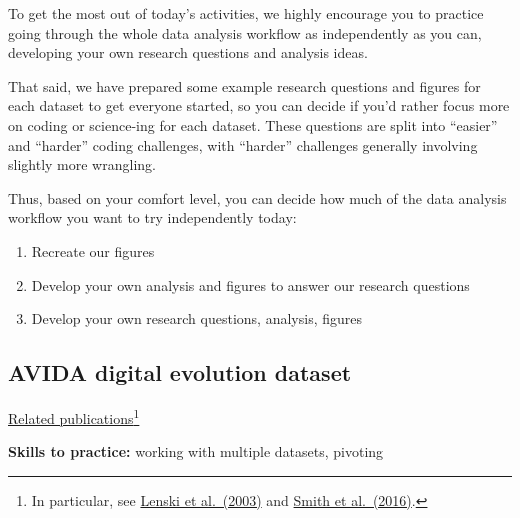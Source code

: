 \documentclass[
  letterpaper,
  DIV=11,
  numbers=noendperiod]{scrreprt}
\providecommand{\tightlist}{%
  \setlength{\itemsep}{0pt}\setlength{\parskip}{0pt}}\usepackage{longtable,booktabs,array}
\begin{document}
\begin{tcolorbox}[enhanced jigsaw, bottomtitle=1mm, bottomrule=.15mm, toprule=.15mm, opacityback=0, leftrule=.75mm, breakable, colback=white, toptitle=1mm, left=2mm, coltitle=black, titlerule=0mm, opacitybacktitle=0.6, title=\textcolor{quarto-callout-tip-color}{\faLightbulb}\hspace{0.5em}{But I thought this was HTLTCode, not HTLTScience!}, rightrule=.15mm, arc=.35mm, colframe=quarto-callout-tip-color-frame, colbacktitle=quarto-callout-tip-color!10!white]

To get the most out of today's activities, we highly encourage you to
practice going through the whole data analysis workflow as independently
as you can, developing your own research questions and analysis ideas.

That said, we have prepared some example research questions and figures
for each dataset to get everyone started, so you can decide if you'd
rather focus more on coding or science-ing for each dataset. These
questions are split into ``easier'' and ``harder'' coding challenges,
with ``harder'' challenges generally involving slightly more wrangling.

Thus, based on your comfort level, you can decide how much of the data
analysis workflow you want to try independently today:

\begin{enumerate}
\def\labelenumi{\arabic{enumi}.}
\tightlist
\item
  Recreate our figures
\item
  Develop your own analysis and figures to answer our research questions
\item
  Develop your own research questions, analysis, figures
\end{enumerate}

\end{tcolorbox}

\subsection{AVIDA digital evolution
dataset}\label{avida-digital-evolution-dataset}

\href{https://avida-ed.msu.edu/digital-evolution/}{Related
publications}\footnote{In particular, see
  \href{https://www.nature.com/articles/nature01568}{Lenski et
  al.~(2003)} and
  \href{https://link.springer.com/article/10.1186/s12052-016-0060-0}{Smith
  et al.~(2016)}.}

\textbf{Skills to practice:} working with multiple datasets, pivoting
\end{document}
